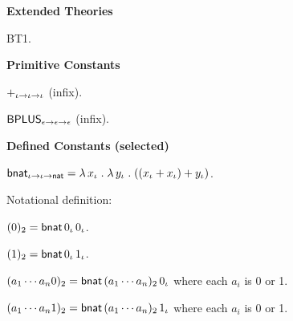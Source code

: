 \begin{biformthy}\em
\bi

  \item[]

  \item[] \textbf{Extended Theories} 

  \be

    \item BT1.

  \ee


  \item[] \textbf{Primitive Constants}

  \be

    \setcounter{enumi}{2}

    \item $+_{\iota \rightarrow \iota \rightarrow \iota}$ (infix).

    \item $\mbox{\sf BPLUS}_{\epsilon \rightarrow \epsilon \rightarrow \epsilon}$ (infix).

  \ee

  \item[] \textbf{Defined Constants (selected)}

  \be

    \setcounter{enumi}{2}

    \item $\mbox{\sf bnat}_{\iota \rightarrow \iota \rightarrow {\sf
        nat}} = \lambda\, x_\iota \mathrel. \lambda\, y_\iota
      \mathrel. ((x_\iota + x_\iota) + y_\iota)$.
      
    Notational definition:

    \bi

      \item[] $(0)_2 = \mbox{\sf bnat} \, 0_\iota \, 0_\iota$.
  
      \item[] $(1)_2 = \mbox{\sf bnat} \, 0_\iota \, 1_\iota$.
  
      \item[] $(a_1 \cdots a_n0)_2 = \mbox{\sf bnat} \, (a_1 \cdots
        a_n)_2 \, 0_\iota$ {\sglsp} where each $a_i$ is 0 or 1.
  
      \item[] $(a_1 \cdots a_n1)_2 = \mbox{\sf bnat} \, (a_1 \cdots
        a_n)_2 \, 1_\iota$ {\sglsp} where each $a_i$ is 0 or 1.
  
    \ei


\end{biformthy}
